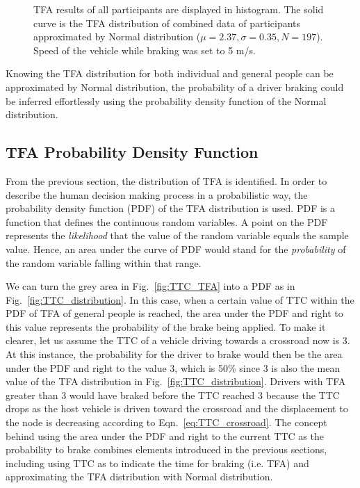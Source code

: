 \begin{figure}[htbp!]
\begin{center}
\end{center}
\caption{TFA results of all participants are displayed in histogram. The solid curve is the TFA distribution of combined data of participants approximated by Normal distribution ($\mu = 2.37, \sigma = 0.35, N = 197$). Speed of the vehicle while braking was set to 5 m/s.}
\label{fig:TFA_distr_combined} 
\end{figure}

Knowing the TFA distribution for both individual and general people can be approximated by Normal distribution, the probability of a driver braking could be inferred effortlessly using the probability density function of the Normal distribution.

 
\subsection{TFA Probability Density Function}
\label{sub:TFA PDF}

From the previous section, the distribution of TFA is identified. In order to describe the human decision making process in a probabilistic way, the probability density function (PDF) of the TFA distribution is used. PDF is a function that defines the continuous random variables. A point on the PDF represents the \textit{likelihood} that the value of the random variable equals the sample value. Hence, an area under the curve of PDF would stand for the \textit{probability} of the random variable falling within that range. 

We can turn the grey area in Fig.~\ref{fig:TTC_TFA} into a PDF as in Fig.~\ref{fig:TTC_distribution}. In this case, when a certain value of TTC within the PDF of TFA of general people is reached, the area under the PDF and right to this value represents the probability of the brake being applied. To make it clearer, let us assume the TTC of a vehicle driving towards a crossroad now is 3. At this instance, the probability for the driver to brake would then be the area under the PDF and right to the value 3, which is 50\% since 3 is also the mean value of the TFA distribution in Fig.~\ref{fig:TTC_distribution}. Drivers with TFA greater than 3 would have braked before the TTC reached 3 because the TTC drops as the host vehicle is driven toward the crossroad and the displacement to the node is decreasing according to Eqn.~\ref{eq:TTC_crossroad}. The concept behind using the area under the PDF and right to the current TTC as the probability to brake combines elements introduced in the previous sections, including using TTC as to indicate the time for braking (i.e. TFA) and approximating the TFA distribution with Normal distribution.

